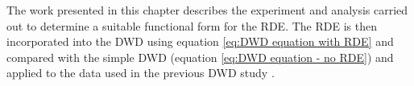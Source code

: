 The work presented in this chapter describes the experiment and analysis carried out to determine a suitable functional form for the RDE.
The RDE is then incorporated into the DWD using equation \ref{eq:DWD equation with RDE} and compared with the simple DWD (equation \ref{eq:DWD equation - no RDE}) and applied to the data used in the previous DWD study \cite{zeldin2013dwd}.
